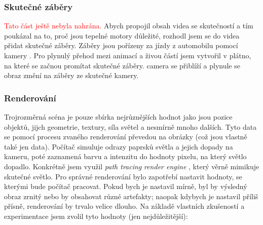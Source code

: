 {\newpage

\subsubsection{Skutečné záběry}
\textcolor{red}{Tato část ještě nebyla nahrána.}\odst
{Abych propojil obsah videa se skutečností a tím poukázal na to, proč jsou tepelné motory důležité, rozhodl jsem se do videa přidat skutečné záběry. Záběry jsou pořízeny za jízdy z automobilu pomocí kamery .}\odst
{Pro plynulý přehod mezi animací a živou částí jsem vytvořil v  plátno, na které se začnou promítat skutečné záběry.  camera se přiblíží a plynule se obraz změní na záběry ze skutečné kamery.}

\newpage

\subsubsection{Renderování}\label{sc:renderovani}
{Trojrozměrná scéna je pouze sbírka nejrůznějších hodnot jako jsou pozice objektů, jijch geometrie, textury, síla světel a nesmírně mnoho dalších. Tyto data se pomocí procesu zvaného renderování převedou na obrázky (což jsou vlastně také jen data). Počítač simuluje odrazy paprsků světla a jejich dopady na kameru, poté zaznamená barvu a intenzitu do hodnoty pixelu, na který světlo dopadlo. Konkrétně jsem využil \textit{path tracing} \textit{render engine} , který věrně mimikuje skutečné světlo.}\odst
{Pro správné renderování bylo zapotřebí nastavit hodnoty, se kterými bude počítač pracovat. Pokud bych je nastavil mírně, byl by výsledný obraz zrnitý nebo by obsahovat různé artefakty; naopak kdybych je nastavil příliš přísně, renderování by trvalo velice dlouho. Na základě vlastních zkušeností a experimentace jsem zvolil tyto hodnoty (jen nejdůležitější): }

}
